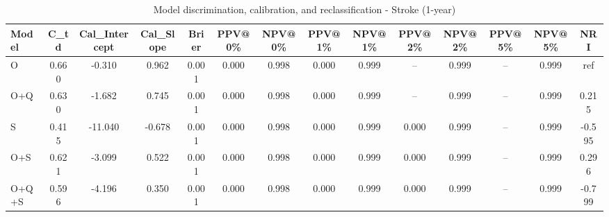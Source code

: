 \begin{table}[htbp]
\centering
\small
\caption{Model discrimination, calibration, and reclassification - Stroke (1-year)}
\label{tab:perf_stroke_1y}
\begin{tabular}{lccccccccccccc}
\toprule
Model & C\_td & Cal\_Intercept & Cal\_Slope & Brier & PPV@0\% & NPV@0\% & PPV@1\% & NPV@1\% & PPV@2\% & NPV@2\% & PPV@5\% & NPV@5\% & NRI \\
\midrule
O & 0.660 & -0.310 & 0.962 & 0.001 & 0.000 & 0.998 & 0.000 & 0.999 & -- & 0.999 & -- & 0.999 & ref \\
O+Q & 0.630 & -1.682 & 0.745 & 0.001 & 0.000 & 0.998 & 0.000 & 0.999 & -- & 0.999 & -- & 0.999 & 0.215 \\
S & 0.415 & -11.040 & -0.678 & 0.001 & 0.000 & 0.998 & 0.000 & 0.999 & 0.000 & 0.999 & -- & 0.999 & -0.595 \\
O+S & 0.621 & -3.099 & 0.522 & 0.001 & 0.000 & 0.998 & 0.000 & 0.999 & 0.000 & 0.999 & -- & 0.999 & 0.296 \\
O+Q+S & 0.596 & -4.196 & 0.350 & 0.001 & 0.000 & 0.998 & 0.000 & 0.999 & 0.000 & 0.999 & -- & 0.999 & -0.799 \\
\bottomrule
\end{tabular}
\end{table}